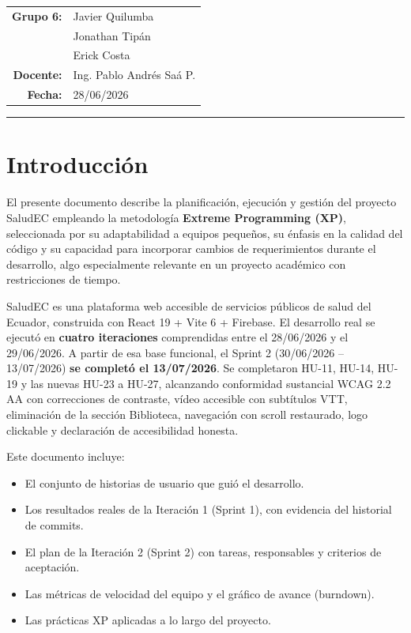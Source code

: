 \documentclass[12pt, a4paper]{article}
\begin{document}
\begin{titlepage}
\vspace{0.8cm}
\begin{tabular}{@{}rl@{}}
  \textbf{\color{navydeep}Grupo 6:} & Javier Quilumba \\
  & Jonathan Tipán \\
  & Erick Costa \\[8pt]
  \textbf{\color{navydeep}Docente:} & Ing. Pablo Andrés Saá P. \\[4pt]
  \textbf{\color{navydeep}Fecha:}   & 28/06/2026 \\
\end{tabular}

\vspace{1.0cm}
{\color{violetxp}\rule{0.85\linewidth}{1.5pt}}
\end{titlepage}

\newpage
{}
\tableofcontents

\newpage
{}

\section{Introducción}

El presente documento describe la planificación, ejecución y gestión del proyecto SaludEC empleando la metodología \textbf{Extreme Programming (XP)}, seleccionada por su adaptabilidad a equipos pequeños, su énfasis en la calidad del código y su capacidad para incorporar cambios de requerimientos durante el desarrollo, algo especialmente relevante en un proyecto académico con restricciones de tiempo.

SaludEC es una plataforma web accesible de servicios públicos de salud del Ecuador, construida con React 19 + Vite 6 + Firebase. El desarrollo real se ejecutó en \textbf{cuatro iteraciones} comprendidas entre el 28/06/2026 y el 29/06/2026. A partir de esa base funcional, el Sprint 2 (30/06/2026 -- 13/07/2026) \textbf{se completó el 13/07/2026}. Se completaron HU-11, HU-14, HU-19 y las nuevas HU-23 a HU-27, alcanzando conformidad sustancial WCAG 2.2 AA con correcciones de contraste, vídeo accesible con subtítulos VTT, eliminación de la sección Biblioteca, navegación con scroll restaurado, logo clickable y declaración de accesibilidad honesta.

Este documento incluye:
\begin{itemize}
  \item El conjunto de historias de usuario que guió el desarrollo.
  \item Los resultados reales de la Iteración 1 (Sprint 1), con evidencia del historial de commits.
  \item El plan de la Iteración 2 (Sprint 2) con tareas, responsables y criterios de aceptación.
  \item Las métricas de velocidad del equipo y el gráfico de avance (burndown).
  \item Las prácticas XP aplicadas a lo largo del proyecto.
\end{itemize}
\end{document}

